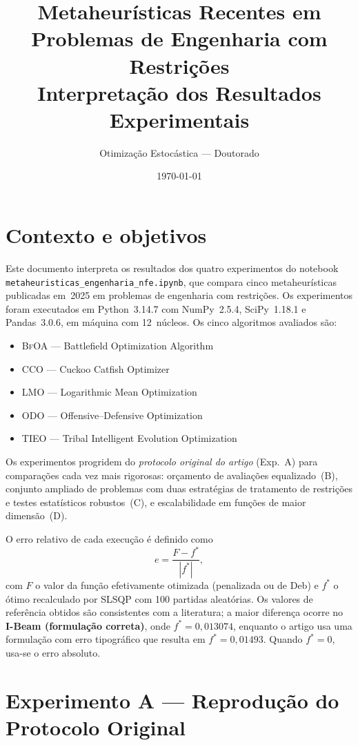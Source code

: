 \documentclass[12pt, a4paper]{article}
\title{\textbf{Metaheurísticas Recentes em Problemas de Engenharia com Restrições}\\[4pt]
       \large Interpretação dos Resultados Experimentais}
\author{Otimização Estocástica --- Doutorado}
\date{\today}
\newcommand{\alg}[1]{\textsc{#1}}
\newcommand{\fref}{f^{*}}
\newcommand{\err}{e}
\begin{document}
\maketitle
\tableofcontents
\newpage

\section{Contexto e objetivos}

Este documento interpreta os resultados dos quatro experimentos do
notebook \texttt{metaheuristicas\_engenharia\_nfe.ipynb}, que compara
cinco metaheurísticas publicadas em~2025 em problemas de engenharia
com restrições. Os experimentos foram executados em Python~3.14.7
com NumPy~2.5.4, SciPy~1.18.1 e Pandas~3.0.6, em máquina com 12~núcleos.
Os cinco algoritmos avaliados são:

\begin{itemize}
  \item \alg{BfOA} — Battlefield Optimization Algorithm
  \item \alg{CCO} — Cuckoo Catfish Optimizer
  \item \alg{LMO} — Logarithmic Mean Optimization
  \item \alg{ODO} — Offensive--Defensive Optimization
  \item \alg{TIEO} — Tribal Intelligent Evolution Optimization
\end{itemize}

Os experimentos progridem do \emph{protocolo original do artigo} (Exp.~A)
para comparações cada vez mais rigorosas: orçamento de avaliações
equalizado~(B), conjunto ampliado de problemas com duas estratégias de
tratamento de restrições e testes estatísticos robustos~(C), e
escalabilidade em funções de maior dimensão~(D).

O erro relativo de cada execução é definido como
\[
  \err = \frac{F - \fref}{|\fref|},
\]
com $F$ o valor da função efetivamente otimizada (penalizada ou de
Deb) e $\fref$ o ótimo recalculado por SLSQP com 100 partidas
aleatórias. Os valores de referência obtidos são consistentes com a
literatura; a maior diferença ocorre no \textbf{I-Beam (formulação
correta)}, onde $\fref = 0{,}013074$, enquanto o artigo usa uma
formulação com erro tipográfico que resulta em $\fref = 0{,}01493$.
Quando $\fref = 0$, usa-se o erro absoluto.

\section{Experimento A — Reprodução do Protocolo Original}
\end{document}
